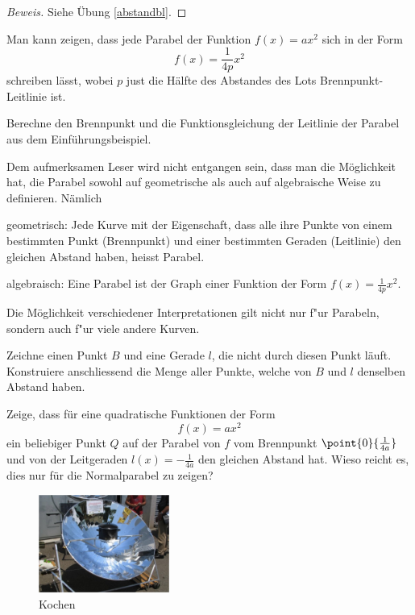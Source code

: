 \documentclass[%
11pt,%
twoside,%
titlepage,%
german,%
headsepline%
]{scrartcl}
\begin{document}
\begin{proof}[Beweis]
Siehe \"Ubung \ref{abstandbl}.
\end{proof}

Man kann zeigen, dass jede Parabel der Funktion $f(x)=ax^2$ sich in der Form
$$f(x) = \frac{1}{4p}x^2$$
schreiben l\"asst, wobei $p$ just die H\"alfte des Abstandes des Lots Brennpunkt-Leitlinie ist.

\begin{ueb}[Brennpunkt]
Berechne den Brennpunkt und die Funktionsgleichung der Leitlinie der Parabel aus dem Ein\-f\"uh\-rungs\-bei\-spiel.
\end{ueb}

\begin{bem}
Dem
aufmerksamen Leser wird nicht entgangen sein, dass man die M\"og\-lich\-keit hat, die Parabel sowohl auf geometrische als auch auf algebraische Weise zu definieren. N\"amlich
\begin{description}
\item geometrisch: Jede Kurve mit der Eigenschaft, dass alle ihre Punkte von einem bestimmten Punkt (Brennpunkt) und einer bestimmten Geraden (Leitlinie) den gleichen Abstand haben, heisst Parabel.
\item algebraisch: Eine Parabel ist der Graph einer Funktion der Form $f(x)=\frac{1}{4p}x^2$.
\end{description}
Die M\"oglichkeit verschiedener Interpretationen gilt nicht nur f"ur Parabeln, sondern auch f"ur viele andere Kurven.
\end{bem}

\begin{ueb}[Geometrie]
Zeichne einen Punkt $B$ und eine Gerade $l$, die nicht durch diesen Punkt l\"auft. Konstruiere anschliessend die Menge aller Punkte, welche von $B$ und $l$ denselben Abstand haben.
\end{ueb}

\begin{ueb}
 \label{abstandbl}
Zeige,
dass f\"ur eine quadratische Funktionen der Form
$$f(x)=ax^2$$
ein beliebiger Punkt $Q$ auf der Parabel von $f$ vom Brennpunkt $\point{0}{\frac{1}{4a}}$ und von der Leitgeraden $l(x)=-\frac{1}{4a}$ den gleichen Abstand hat.
Wieso reicht es, dies nur f\"ur die Normalparabel zu zeigen?
\end{ueb}

\begin{figure}
\centering
\includegraphics[width=0.382\textwidth]{pictures/herd}
\caption{Kochen}
\end{figure}
\end{document}
